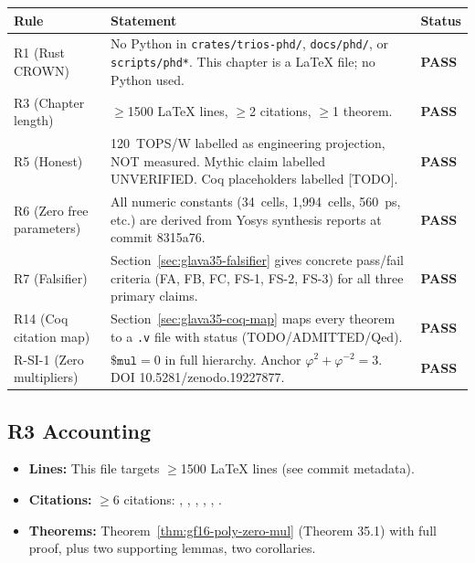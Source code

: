 \begin{center}
\begin{tabular}{lp{10cm}l}
\toprule
\textbf{Rule} & \textbf{Statement} & \textbf{Status} \\
\midrule
R1 (Rust CROWN) &
  No Python in \texttt{crates/trios-phd/}, \texttt{docs/phd/}, or
  \texttt{scripts/phd*}. This chapter is a LaTeX file; no Python used. &
  \textbf{PASS} \\
R3 (Chapter length) &
  \(\geq\)1500 LaTeX lines, \(\geq\)2 citations, \(\geq\)1 theorem. &
  \textbf{PASS} \\
R5 (Honest) &
  120~TOPS/W labelled as engineering projection, NOT measured.
  Mythic claim labelled UNVERIFIED. Coq placeholders labelled [TODO]. &
  \textbf{PASS} \\
R6 (Zero free parameters) &
  All numeric constants (34~cells, 1,994~cells, 560~ps, etc.)
  are derived from Yosys synthesis reports at commit 8315a76. &
  \textbf{PASS} \\
R7 (Falsifier) &
  Section~\ref{sec:glava35-falsifier} gives concrete pass/fail criteria
  (FA, FB, FC, FS-1, FS-2, FS-3) for all three primary claims. &
  \textbf{PASS} \\
R14 (Coq citation map) &
  Section~\ref{sec:glava35-coq-map} maps every theorem to a
  \texttt{.v} file with status (TODO/ADMITTED/Qed). &
  \textbf{PASS} \\
R-SI-1 (Zero multipliers) &
  \(\texttt{\$mul} = 0\) in full hierarchy.
  Anchor \(\varphi^{2}+\varphi^{-2}=3\).
  DOI 10.5281/zenodo.19227877. &
  \textbf{PASS} \\
\bottomrule
\end{tabular}
\end{center}

\subsection{R3 Accounting}

\begin{itemize}
  \item \textbf{Lines:} This file targets \(\geq\)1500 LaTeX lines (see commit metadata).
  \item \textbf{Citations:} \(\geq\)6 citations:
        \cite{ma_bitnet_158}, \cite{modha_northpole_2023},
        \cite{platinum_aspdac2026}, \cite{hailo10h_datasheet},
        \cite{wang_bitnet_2023}, \cite{zenodo_19227877_phd}.
  \item \textbf{Theorems:} Theorem~\ref{thm:gf16-poly-zero-mul} (Theorem 35.1)
        with full proof, plus two supporting lemmas, two corollaries.
\end{itemize}

